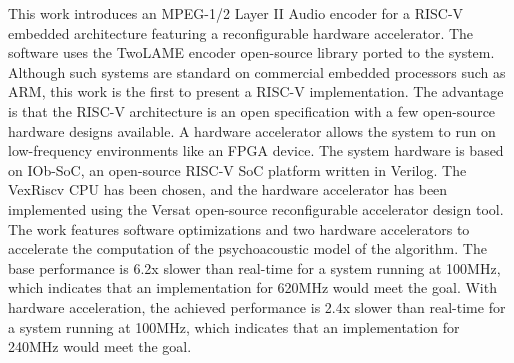 \hspace{0.4cm} This work introduces an MPEG-1/2 Layer II Audio encoder for a RISC-V embedded architecture featuring a reconfigurable hardware accelerator. The software uses the TwoLAME encoder open-source library ported to the system. Although such systems are standard on commercial embedded processors such as ARM, this work is the first to present a RISC-V implementation. The advantage is that the RISC-V architecture is an open specification with a few open-source hardware designs available. A hardware accelerator allows the system to run on low-frequency environments like an FPGA device. The system hardware is based on IOb-SoC, an open-source RISC-V SoC platform written in Verilog. The VexRiscv CPU has been chosen, and the hardware accelerator has been implemented using the Versat open-source reconfigurable accelerator design tool. The work features software optimizations and two hardware accelerators to accelerate the computation of the psychoacoustic model of the algorithm. The base performance is 6.2x slower than real-time for a system running at 100MHz, which indicates that an implementation for 620MHz would meet the goal. With hardware acceleration, the achieved performance is 2.4x slower than real-time for a system running at 100MHz, which indicates that an implementation for 240MHz would meet the goal.
